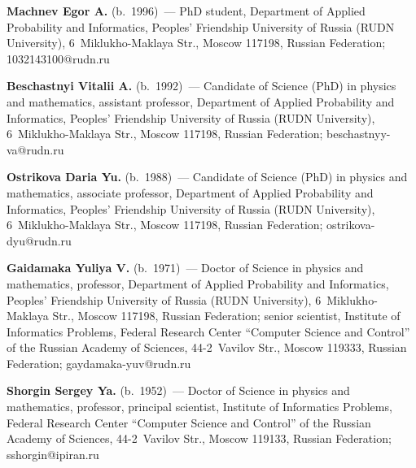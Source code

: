   
  \Contr
  
  \vspace*{-3pt}
  
  \noindent
  \textbf{Machnev Egor A.} (b.\ 1996)~--- PhD student, Department of Applied Probability and 
Informatics, Peoples' Friendship University of Russia (RUDN University),  
6~Miklukho-Maklaya Str., Moscow 117198, Russian Federation; \mbox{1032143100@rudn.ru}
  
  \vspace*{3pt}
  
  \noindent
  \textbf{Beschastnyi Vitalii A.} (b.\ 1992)~--- Candidate of Science (PhD) in physics and 
mathematics, assistant professor, Department of Applied Probability and Informatics, Peoples' 
Friendship University of Russia (RUDN University), 6~Miklukho-Maklaya Str., Moscow 
117198, Russian Federation; \mbox{beschastnyy-va@rudn.ru}
  
  
  \vspace*{3pt}
  
  \noindent
  \textbf{Ostrikova Daria Yu.} (b.\ 1988)~--- Candidate of Science (PhD) in physics and 
mathematics, associate professor, Department of Applied Probability and Informatics, Peoples' 
Friendship University of Russia (RUDN University), 6~Miklukho-Maklaya Str., Moscow 
117198, Russian Federation; \mbox{ostrikova-dyu@rudn.ru}
  
  
  
  \vspace*{3pt}
  
  \noindent
  \textbf{Gaidamaka Yuliya V.} (b.\ 1971)~--- Doctor of Science in physics and mathematics, 
professor, Department of Applied Probability and Informatics, Peoples' Friendship University of 
Russia (RUDN University), 6~Miklukho-Maklaya Str., Moscow 117198, Russian Federation; 
senior scientist, Institute of Informatics Problems, Federal Research Center ``Computer Science 
and Control'' of the Russian Academy of Sciences, 44-2~Vavilov Str., Moscow 119333, Russian 
Federation; \mbox{gaydamaka-yuv@rudn.ru}
  
  
  \vspace*{3pt}
  
  \noindent
  \textbf{Shorgin Sergey Ya.} (b.\ 1952)~--- Doctor of Science in physics and mathematics, 
professor, principal scientist, Institute of Informatics Problems, Federal Research Center 
``Computer Science and Control'' of the Russian Academy of Sciences, 44-2~Vavilov Str., 
Moscow 119133, Russian Federation; \mbox{sshorgin@ipiran.ru}
  
\label{end\stat}

\renewcommand{\bibname}{\protect\rm Литература}    
  